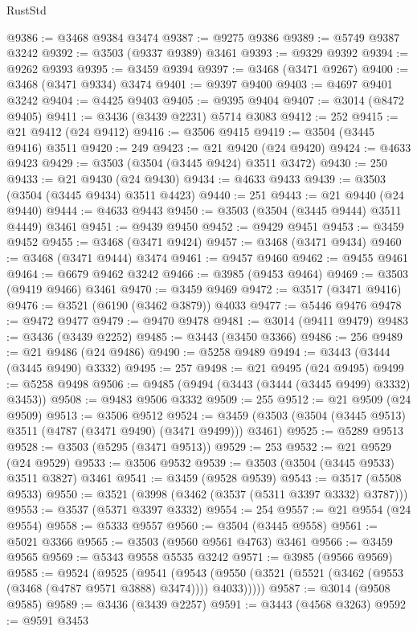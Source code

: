 \begin{lexlean}{RustStd}
\begin{coremodule}
@9386 := @3468 @9384 @3474
@9387 := @9275 @9386
@9389 := @5749 @9387 @3242
@9392 := @3503 (@9337 @9389) @3461
@9393 := @9329 @9392
@9394 := @9262 @9393
@9395 := @3459 @9394
@9397 := @3468 (@3471 @9267)
@9400 := @3468 (@3471 @9334) @3474
@9401 := @9397 @9400
@9403 := @4697 @9401 @3242
@9404 := @4425 @9403
@9405 := @9395 @9404
@9407 := @3014 (@8472 @9405)
@9411 := @3436 (@3439 @2231) @5714 @3083
@9412 := 252
@9415 := @21 @9412 (@24 @9412)
@9416 := @3506 @9415
@9419 := @3504 (@3445 @9416) @3511
@9420 := 249
@9423 := @21 @9420 (@24 @9420)
@9424 := @4633 @9423
@9429 := @3503 (@3504 (@3445 @9424) @3511 @3472)
@9430 := 250
@9433 := @21 @9430 (@24 @9430)
@9434 := @4633 @9433
@9439 := @3503 (@3504 (@3445 @9434) @3511 @4423)
@9440 := 251
@9443 := @21 @9440 (@24 @9440)
@9444 := @4633 @9443
@9450 := @3503 (@3504 (@3445 @9444) @3511 @4449) @3461
@9451 := @9439 @9450
@9452 := @9429 @9451
@9453 := @3459 @9452
@9455 := @3468 (@3471 @9424)
@9457 := @3468 (@3471 @9434)
@9460 := @3468 (@3471 @9444) @3474
@9461 := @9457 @9460
@9462 := @9455 @9461
@9464 := @6679 @9462 @3242
@9466 := @3985 (@9453 @9464)
@9469 := @3503 (@9419 @9466) @3461
@9470 := @3459 @9469
@9472 := @3517 (@3471 @9416)
@9476 := @3521 (@6190 (@3462 @3879)) @4033
@9477 := @5446 @9476
@9478 := @9472 @9477
@9479 := @9470 @9478
@9481 := @3014 (@9411 @9479)
@9483 := @3436 (@3439 @2252)
@9485 := @3443 (@3450 @3366)
@9486 := 256
@9489 := @21 @9486 (@24 @9486)
@9490 := @5258 @9489
@9494 := @3443 (@3444 (@3445 @9490) @3332)
@9495 := 257
@9498 := @21 @9495 (@24 @9495)
@9499 := @5258 @9498
@9506 := @9485 (@9494 (@3443 (@3444 (@3445 @9499) @3332) @3453))
@9508 := @9483 @9506 @3332
@9509 := 255
@9512 := @21 @9509 (@24 @9509)
@9513 := @3506 @9512
@9524 := @3459 (@3503 (@3504 (@3445 @9513) @3511 (@4787 (@3471 @9490) (@3471 @9499))) @3461)
@9525 := @5289 @9513
@9528 := @3503 (@5295 (@3471 @9513))
@9529 := 253
@9532 := @21 @9529 (@24 @9529)
@9533 := @3506 @9532
@9539 := @3503 (@3504 (@3445 @9533) @3511 @3827) @3461
@9541 := @3459 (@9528 @9539)
@9543 := @3517 (@5508 @9533)
@9550 := @3521 (@3998 (@3462 (@3537 (@5311 @3397 @3332) @3787)))
@9553 := @3537 (@5371 @3397 @3332)
@9554 := 254
@9557 := @21 @9554 (@24 @9554)
@9558 := @5333 @9557
@9560 := @3504 (@3445 @9558)
@9561 := @5021 @3366
@9565 := @3503 (@9560 @9561 @4763) @3461
@9566 := @3459 @9565
@9569 := @5343 @9558 @5535 @3242
@9571 := @3985 (@9566 @9569)
@9585 := @9524
    (@9525
      (@9541
        (@9543 (@9550 (@3521 (@5521 (@3462 (@9553 (@3468 (@4787 @9571 @3888) @3474)))) @4033)))))
@9587 := @3014 (@9508 @9585)
@9589 := @3436 (@3439 @2257)
@9591 := @3443 (@4568 @3263)
@9592 := @9591 @3453

\end{coremodule}
\end{lexlean}
